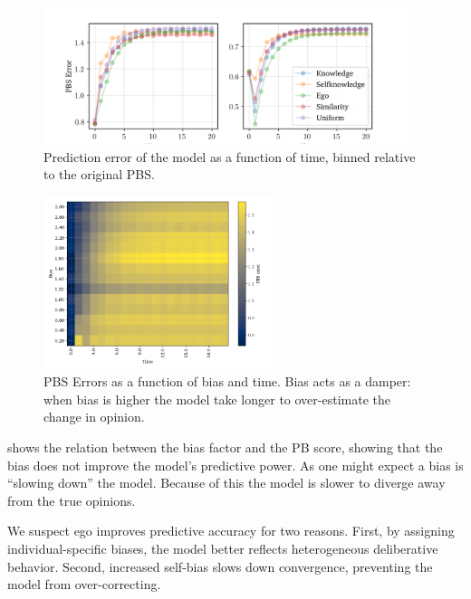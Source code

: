 \begin{figure}[ht]
	\begin{center}
		\includegraphics[width=0.95\textwidth]{Figures/errors_binned.png}
	\end{center}
	\caption{Prediction error of the model as a function of time, binned relative to the original  PBS.}\label{fig:binned_errors}
\end{figure}


\begin{figure}[ht]
	\centering

	\includegraphics[width=0.6\textwidth]{Figures/bias_time_imshow.png}
	\hspace{1em}
	\caption{PBS Errors as a function of bias and time. Bias acts as a damper: when bias is higher the model take longer to over-estimate the change in opinion.}
	\label{fig:bias_slowdown}
\end{figure}

 shows the relation between the bias factor and the PB
score, showing that the bias does not improve the model's predictive power. As
one might expect a bias is ``slowing down'' the model. Because of this the
model is slower to diverge away from the true opinions.

We suspect ego improves predictive accuracy for two reasons. First, by
assigning individual-specific biases, the model better reflects heterogeneous
deliberative behavior. Second, increased self-bias slows down convergence,
preventing the model from over-correcting.

